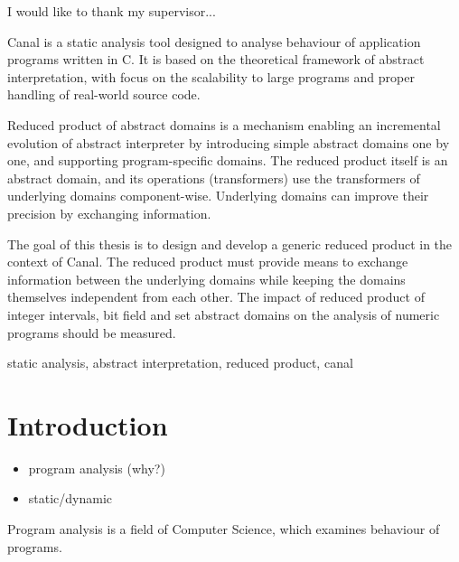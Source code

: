 \documentclass[12pt,oneside]{fithesis2}
\theoremstyle{definition}
\begin{document}
\FrontMatter
\ThesisTitlePage

\begin{ThesisDeclaration}
\DeclarationText
\AdvisorName
\end{ThesisDeclaration}

\begin{ThesisThanks}
I would like to thank my supervisor...
\end{ThesisThanks}

\begin{ThesisAbstract}
Canal is a static analysis tool designed to analyse behaviour of application programs written in C. It is based on the theoretical framework of abstract interpretation, with focus on the scalability to large programs and proper handling of real-world source code.

Reduced product of abstract domains is a mechanism enabling an incremental evolution of abstract interpreter by introducing simple abstract domains one by one, and supporting program-specific domains. The reduced product itself is an abstract domain, and its operations (transformers) use the transformers of underlying domains component-wise. Underlying domains can improve their precision by exchanging information.

The goal of this thesis is to design and develop a generic reduced product in the context of Canal. The reduced product must provide means to exchange information between the underlying domains while keeping the domains themselves independent from each other. The impact of reduced product of integer intervals, bit field and set abstract domains on the analysis of numeric programs should be measured.
\end{ThesisAbstract}

\begin{ThesisKeyWords}
static analysis, abstract interpretation, reduced product, canal
\end{ThesisKeyWords}

\tableofcontents

\MainMatter
\chapter{Introduction}
\begin{itemize}
  \item program analysis (why?)
  \item static/dynamic
\end{itemize}

Program analysis is a field of Computer Science, which examines behaviour of programs.
\end{document}

